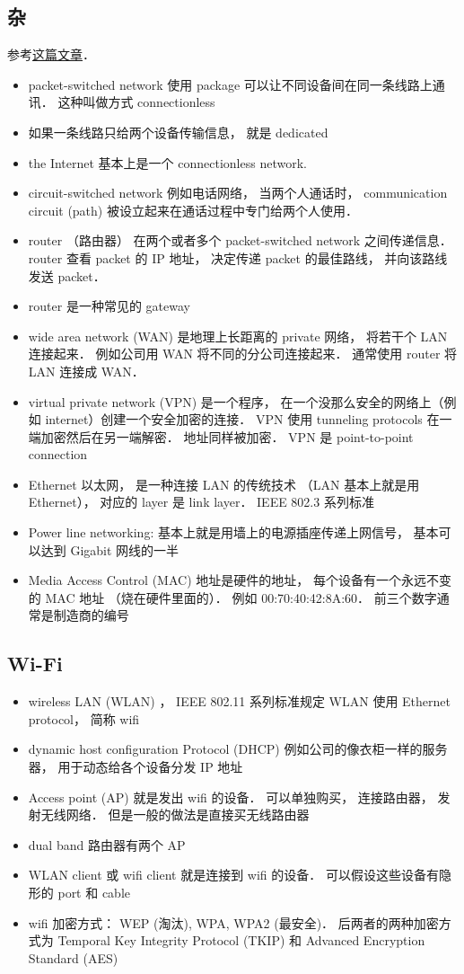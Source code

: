 \subsection{杂}
参考\href{https://www.cnet.com/how-to/home-networking-explained-part-1-heres-the-url-for-you/}{这篇文章}．
\begin{itemize}
\item packet-switched network 使用 package 可以让不同设备间在同一条线路上通讯． 这种叫做方式 connectionless
\item 如果一条线路只给两个设备传输信息， 就是 dedicated
\item the Internet 基本上是一个 connectionless network.
\item circuit-switched network 例如电话网络， 当两个人通话时， communication circuit (path) 被设立起来在通话过程中专门给两个人使用．
\item router （路由器） 在两个或者多个 packet-switched network 之间传递信息． router 查看 packet 的 IP 地址， 决定传递 packet 的最佳路线， 并向该路线发送 packet．
\item router 是一种常见的 gateway
\item wide area network (WAN) 是地理上长距离的 private 网络， 将若干个 LAN 连接起来． 例如公司用 WAN 将不同的分公司连接起来． 通常使用 router 将 LAN 连接成 WAN．
\item virtual private network (VPN) 是一个程序， 在一个没那么安全的网络上（例如 internet）创建一个安全加密的连接． VPN 使用 tunneling protocols 在一端加密然后在另一端解密． 地址同样被加密． VPN 是 point-to-point connection
\item Ethernet 以太网， 是一种连接 LAN 的传统技术 （LAN 基本上就是用 Ethernet）， 对应的 layer 是 link layer．  IEEE 802.3 系列标准
\item Power line networking: 基本上就是用墙上的电源插座传递上网信号， 基本可以达到 Gigabit 网线的一半
\item Media Access Control (MAC) 地址是硬件的地址， 每个设备有一个永远不变的 MAC 地址 （烧在硬件里面的）． 例如 00:70:40:42:8A:60． 前三个数字通常是制造商的编号
\end{itemize}

\subsection{Wi-Fi}
\begin{itemize}
\item wireless LAN (WLAN) ， IEEE 802.11 系列标准规定 WLAN 使用 Ethernet protocol， 简称 wifi
\item dynamic host configuration Protocol (DHCP) 例如公司的像衣柜一样的服务器， 用于动态给各个设备分发 IP 地址
\item Access point (AP) 就是发出 wifi 的设备． 可以单独购买， 连接路由器， 发射无线网络． 但是一般的做法是直接买无线路由器
\item dual band 路由器有两个 AP
\item WLAN client 或 wifi client 就是连接到 wifi 的设备． 可以假设这些设备有隐形的 port 和 cable
\item wifi 加密方式： WEP (淘汰), WPA, WPA2 (最安全)． 后两者的两种加密方式为 Temporal Key Integrity Protocol (TKIP) 和 Advanced Encryption Standard (AES)
\end{itemize}


